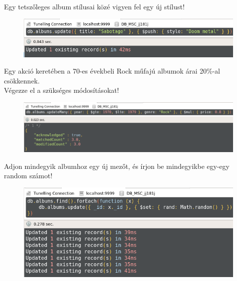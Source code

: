 \documentclass[a4paper, 12pt]{article}
\begin{document}
\noindent Egy tetszőleges album stílusai közé vigyen fel egy új stílust!
\begin{figure}[!hb]
	\centering
	\includegraphics[scale = 0.6]{images/1_c2.png}
	\label{fig:1_c2}
\end{figure}	

\noindent Egy akció keretében a 70-es évekbeli Rock műfajú albumok árai 20$\%$-al csökkennek.\\Végezze el a szükséges módosításokat!
\begin{figure}[!hb]
	\centering
	\includegraphics[scale = 0.5]{images/1_c3.png}
	\label{fig:1_c3}
\end{figure}	

\noindent Adjon mindegyik albumhoz egy új mezőt, és írjon be mindegyikbe egy-egy random számot!
\begin{figure}[!hb]
	\centering
	\includegraphics[scale = 0.6]{images/1_c4.png}
	\label{fig:1_c4}
\end{figure}	
\clearpage
\end{document}
